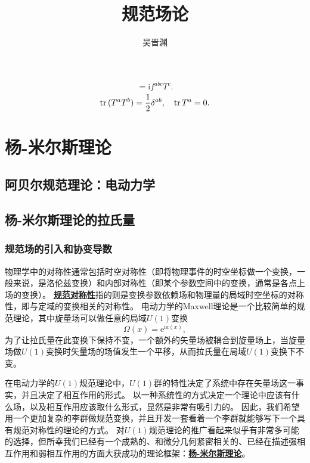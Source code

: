 \documentclass[hyperref, UTF8, a4paper]{ctexart}
\title{规范场论}
\author{吴晋渊}
\newcommand*{\ii}{\mathrm{i}}
\newcommand*{\ee}{\mathrm{e}}
\newcommand{\concept}[1]{\underline{\textbf{#1}}}
\begin{document}
\maketitle

\begin{equation}
    [T^a, T^b] = \ii f^{abc} T^c.
\end{equation}
\begin{equation}
    \trace{(T^a T^b)} = \frac{1}{2} \delta^{ab}, \quad \trace{T^a} = 0.
\end{equation}

\section{杨-米尔斯理论}

\subsection{阿贝尔规范理论：电动力学}

\subsection{杨-米尔斯理论的拉氏量}

\subsubsection{规范场的引入和协变导数}

物理学中的对称性通常包括时空对称性（即将物理事件的时空坐标做一个变换，一般来说，是洛伦兹变换）和内部对称性（即某个参数空间中的变换，通常是各点上场的变换）。
\concept{规范对称性}指的则是变换参数依赖场和物理量的局域时空坐标的对称性，即与定域的变换相关的对称性。
电动力学的Maxwell理论是一个比较简单的规范理论，其中旋量场可以做任意的局域$U(1)$变换
\[
    \Omega(x) = \ee^{\ii a(x)},
\]
为了让拉氏量在此变换下保持不变，一个额外的矢量场被耦合到旋量场上，当旋量场做$U(1)$变换时矢量场的场值发生一个平移，从而拉氏量在局域$U(1)$变换下不变。

在电动力学的$U(1)$规范理论中，$U(1)$群的特性决定了系统中存在矢量场这一事实，并且决定了相互作用的形式。
以一种系统性的方式决定一个理论中应该有什么场，以及相互作用应该取什么形式，显然是非常有吸引力的。
因此，我们希望用一个更加复杂的李群做规范变换，并且开发一套看着一个李群就能够写下一个具有规范对称性的理论的方式。
对$U(1)$规范理论的推广看起来似乎有非常多可能的选择，但所幸我们已经有一个成熟的、和微分几何紧密相关的、已经在描述强相互作用和弱相互作用的方面大获成功的理论框架：\concept{杨-米尔斯理论}。
\end{document}
